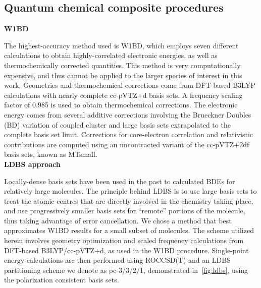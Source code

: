 \subsection{Quantum chemical composite procedures}

\noindent \textbf{W1BD}

The highest-accuracy method used is W1BD, which employs seven different calculations to obtain highly-correlated electronic energies, as well as thermochemically corrected quantities. This method is very computationally expensive, and thus cannot be applied to the larger species of interest in this work. Geometries and thermochemical corrections come from DFT-based B3LYP calculations with nearly complete cc-pVTZ+d basis sets. A frequency scaling factor of 0.985 is used to obtain thermochemical corrections. The electronic energy comes from several additive corrections involving the Brueckner Doubles\cite{Barnes2009} (BD) variation of coupled cluster and large basis sets extrapolated to the complete basis set limit. Corrections for core-electron correlation and relativistic contributions are computed using an uncontracted variant of the cc-pVTZ+2df basis sets, known as MTsmall.\cite{Martin1999}
\\

\noindent \textbf{LDBS approach}

Locally-dense basis sets have been used in the past to calculated BDEs for relatively large molecules.\cite{DiLabio1998, DiLabio1999LDBS, Wright2001} The principle behind LDBS is to use large basis sets to treat the atomic centres that are directly involved in the chemistry taking place, and use progressively smaller basis sets for ``remote'' portions of the molecule, thus taking advantage of error cancellation. We chose a method that best approximates W1BD results for a small subset of molecules. The scheme utilized herein involves geometry optimization and scaled frequency calculations from DFT-based B3LYP/cc-pVTZ+d, as used in the W1BD procedure. Single-point energy calculations are then performed using ROCCSD(T) and an LDBS partitioning scheme we denote as pc-3/3/2/1, demonstrated in~\ref{fig:ldbs}, using the polarization consistent basis sets.\cite{Jensen2001}

